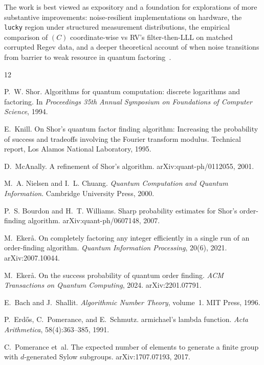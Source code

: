 \documentclass[11pt]{article}
\begin{document}
The work is best viewed as expository and a foundation for explorations of more substantive improvements: noise-resilient implementations on hardware, the \texttt{lucky} region under structured measurement distributions, the empirical comparison of $(C)$ coordinate-wise vs RV's filter-then-LLL on matched corrupted Regev data, and a deeper theoretical account of when noise transitions from barrier to weak resource in quantum factoring~\cite{regev2023}.

\begin{thebibliography}{12}

P.~W. Shor.
\newblock Algorithms for quantum computation: discrete logarithms and factoring.
\newblock In \emph{Proceedings 35th Annual Symposium on Foundations of Computer Science}, 1994.

E.~Knill.
\newblock On Shor's quantum factor finding algorithm: Increasing the probability of success and tradeoffs involving the {F}ourier transform modulus.
\newblock Technical report, Los Alamos National Laboratory, 1995.

D.~McAnally.
\newblock A refinement of {S}hor's algorithm.
\newblock arXiv:quant-ph/0112055, 2001.

M.~A. Nielsen and I.~L. Chuang.
\newblock \emph{Quantum Computation and Quantum Information}.
\newblock Cambridge University Press, 2000.

P.~S. Bourdon and H.~T. Williams.
\newblock Sharp probability estimates for {S}hor's order-finding algorithm.
\newblock arXiv:quant-ph/0607148, 2007.

M.~Ekerå.
\newblock On completely factoring any integer efficiently in a single run of an order-finding algorithm.
\newblock \emph{Quantum Information Processing}, 20(6), 2021.
\newblock arXiv:2007.10044.

M.~Ekerå.
\newblock On the success probability of quantum order finding.
\newblock \emph{ACM Transactions on Quantum Computing}, 2024.
\newblock arXiv:2201.07791.

E.~Bach and J.~Shallit.
\newblock \emph{Algorithmic Number Theory}, volume~1.
\newblock MIT Press, 1996.

P.~Erdős, C.~Pomerance, and E.~Schmutz.
armichael's lambda function.
\newblock \emph{Acta Arithmetica}, 58(4):363--385, 1991.

C.~Pomerance et~al.
\newblock The expected number of elements to generate a finite group with $d$-generated {S}ylow subgroups.
\newblock arXiv:1707.07193, 2017.


\end{thebibliography}
\end{document}

